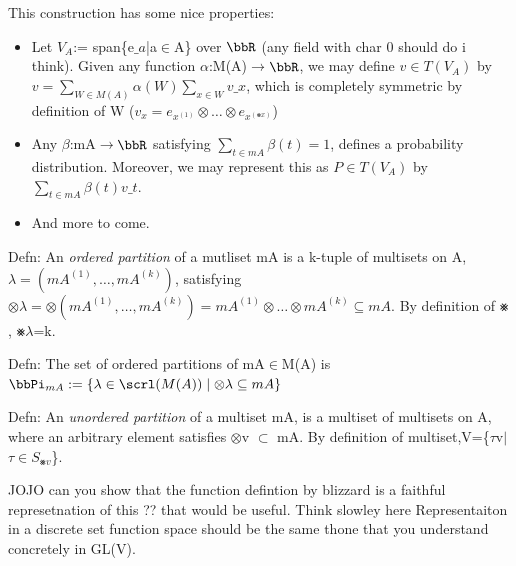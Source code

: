 \documentclass[12pt,a4paper]{article}
\begin{document}
This construction has some nice properties:

\begin{itemize}
\item Let $V_A$:= span\{e\ensuremath{\_a}|a\ensuremath{\in}A\} over \ensuremath{\bbR} (any field with char 0 should do i think). Given any function \ensuremath{\alpha}:M(A)\ensuremath{\rightarrow}\ensuremath{\bbR}, we may define $v \ensuremath{\in} T(V_A)$ by $v = \ensuremath{\sum}_{W \ensuremath{\in} M(A)} \ensuremath{\alpha}(W)\ensuremath{\sum}_{x\ensuremath{\in}W}v\ensuremath{\_x}$, which is completely symmetric by definition of W ($v_x = e_{x^{(1)}}\ensuremath{\otimes}\ensuremath{\ldots}\ensuremath{\otimes}e_{x^{(\ensuremath{\smashtimes}x)}}$)


\item Any \ensuremath{\beta}:mA\ensuremath{\rightarrow}\ensuremath{\bbR} satisfying $\ensuremath{\sum}_{t\ensuremath{\in}mA} \ensuremath{\beta}(t) = 1$, defines a probability distribution. Moreover, we may represent this as $P \ensuremath{\in} T(V_A)$ by $\ensuremath{\sum}_{t\ensuremath{\in}mA} \ensuremath{\beta}(t)v\ensuremath{\_t}$.


\item And more to come.

\end{itemize}

Defn: An \emph{ordered partition} of a mutliset mA is a k-tuple of multisets on A,$\ensuremath{\lambda}=(mA^{(1)},\ensuremath{\ldots},mA^{(k)})$, satisfying $\ensuremath{\otimes}\ensuremath{\lambda}=\ensuremath{\otimes}(mA^{(1)},\ensuremath{\ldots},mA^{(k)})=mA^{(1)}\ensuremath{\otimes}\ensuremath{\ldots}\ensuremath{\otimes}mA^{(k)}\ensuremath{\subseteq} mA$. By definition of \ensuremath{\smashtimes}, \ensuremath{\smashtimes}\ensuremath{\lambda}=k. 


Defn: The set of ordered partitions of mA\ensuremath{\in}M(A) is $\ensuremath{\bbPi}_{mA}:=\{\ensuremath{\lambda} \ensuremath{\in} \ensuremath{\scrl}(M(A)) \ensuremath{\mid} \ensuremath{\otimes}\ensuremath{\lambda} \ensuremath{\subseteq} mA\}$


Defn: An \emph{unordered partition} of a multiset mA, is a multiset of multisets on A, where an arbitrary element satisfies \ensuremath{\otimes}v \ensuremath{\subset} mA. By definition of multiset,V=\{\ensuremath{\tau}v\ensuremath{\mid}$\ensuremath{\tau}\ensuremath{\in}S_{\ensuremath{\smashtimes}v}$\}.


JOJO can you show that the function defintion by blizzard is a faithful represetnation of this ?? that would be useful. Think slowley here Representaiton in a discrete set function space should be the same thone that you understand concretely in GL(V).
\end{document}
